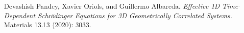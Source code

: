 \documentclass[11pt, a4paper]{article} %
\begin{document}

\begin{thebibliography}{1}

	

	Devashish Pandey, Xavier Oriols, and Guillermo Albareda. {\em Effective 1D Time-Dependent Schrödinger Equations for 3D Geometrically Correlated Systems.} Materials 13.13 (2020): 3033.




	
\end{thebibliography}
\end{document}
